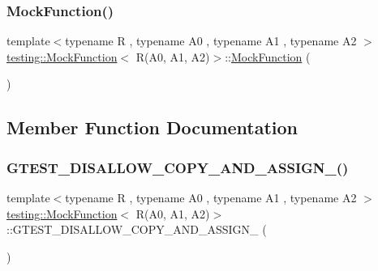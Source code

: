 \subsubsection{\texorpdfstring{MockFunction()}{MockFunction()}}
{\footnotesize\ttfamily template$<$typename R , typename A0 , typename A1 , typename A2 $>$ \\
\mbox{\hyperlink{classtesting_1_1_mock_function}{testing\+::\+Mock\+Function}}$<$ R(A0, A1, A2)$>$\+::\mbox{\hyperlink{classtesting_1_1_mock_function}{Mock\+Function}} (\begin{DoxyParamCaption}{ }\end{DoxyParamCaption})\hspace{0.3cm}{\ttfamily [inline]}}



\subsection{Member Function Documentation}
\mbox{\label{classtesting_1_1_mock_function_3_01_r_07_a0_00_01_a1_00_01_a2_08_4_acf04153a26d9b03d0f3bf1abf9fdb694}} 
\subsubsection{\texorpdfstring{GTEST\_DISALLOW\_COPY\_AND\_ASSIGN\_()}{GTEST\_DISALLOW\_COPY\_AND\_ASSIGN\_()}}
{\footnotesize\ttfamily template$<$typename R , typename A0 , typename A1 , typename A2 $>$ \\
\mbox{\hyperlink{classtesting_1_1_mock_function}{testing\+::\+Mock\+Function}}$<$ R(A0, A1, A2)$>$\+::G\+T\+E\+S\+T\+\_\+\+D\+I\+S\+A\+L\+L\+O\+W\+\_\+\+C\+O\+P\+Y\+\_\+\+A\+N\+D\+\_\+\+A\+S\+S\+I\+G\+N\+\_\+ (\begin{DoxyParamCaption}\item[{\mbox{\hyperlink{classtesting_1_1_mock_function}{Mock\+Function}}$<$ R(A0, A1, A2)$>$}]{ }\end{DoxyParamCaption})\hspace{0.3cm}{\ttfamily [private]}}

\mbox{\label{classtesting_1_1_mock_function_3_01_r_07_a0_00_01_a1_00_01_a2_08_4_afcc79eab94b7d873f71ccf7b08ce582f}} 
